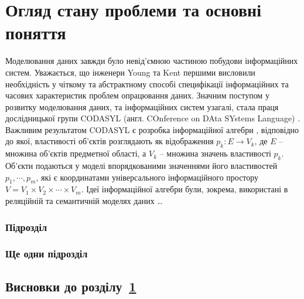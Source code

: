 \chapter{Огляд стану проблеми та основні поняття}\label{ch:01}

Моделювання даних завжди було невід'ємною частиною побудови інформаційних систем. Уважається, що інженери Young та Kent \cite{YoKe1958} першими висловили необхідність у чіткому та абстрактному способі специфікації інформаційних та часових характеристик проблем опрацювання даних. Значним поступом у розвитку моделювання даних, та інформаційних систем узагалі, стала праця дослідницької групи CODASYL (англ. COnference on DAta SYstems Language) \cite{CODASYL1962}. Важливим результатом CODASYL є розробка інформаційної алгебри \cite{Kal1983}, відповідно до якої, властивості об'єктів розглядають як відображення $p_k:E\rightarrow V_k$, де $E$ -- множина об'єктів предметної області, а $V_k$ -- множина значень властивості $p_k$. Об'єкти подаються у моделі впорядкованими значеннями його властивостей $p_1,\cdots,p_m$, які є координатами універсального інформаційного простору $V=V_1\times V_2\times\cdots\times V_m$. Ідеї інформаційної алгебри були, зокрема, використані в реляційній та семантичній моделях даних \cite{Oli2009}\ldots

\subsection{Підрозділ}

\subsection{Ще одни підрозділ}

\section{Висновки до розділу~\ref{ch:01}}